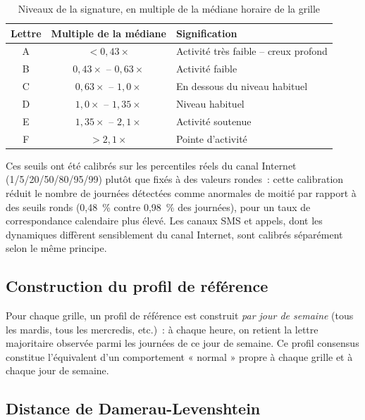\begin{table}[htbp]
  \centering
  \caption{Niveaux de la signature, en multiple de la médiane horaire de la grille}
  \label{tab:levels}
  \begin{tabular}{ccl}
    \toprule
    \textbf{Lettre} & \textbf{Multiple de la médiane} & \textbf{Signification} \\
    \midrule
    A & $< 0{,}43\times$          & Activité très faible -- creux profond \\
    B & $0{,}43\times$ -- $0{,}63\times$ & Activité faible \\
    C & $0{,}63\times$ -- $1{,}0\times$  & En dessous du niveau habituel \\
    D & $1{,}0\times$ -- $1{,}35\times$  & Niveau habituel \\
    E & $1{,}35\times$ -- $2{,}1\times$  & Activité soutenue \\
    F & $> 2{,}1\times$           & Pointe d'activité \\
    \bottomrule
  \end{tabular}
\end{table}

Ces seuils ont été calibrés sur les percentiles réels du canal
Internet (1/5/20/50/80/95/99) plutôt que fixés à des valeurs rondes~:
cette calibration réduit le nombre de journées détectées comme
anormales de moitié par rapport à des seuils ronds (0,48~\% contre
0,98~\% des journées), pour un taux de correspondance calendaire plus
élevé. Les canaux SMS et appels, dont les dynamiques diffèrent
sensiblement du canal Internet, sont calibrés séparément selon le même
principe.

\subsection{Construction du profil de référence}

Pour chaque grille, un profil de référence est construit \emph{par
jour de semaine} (tous les mardis, tous les mercredis, etc.)~: à
chaque heure, on retient la lettre majoritaire observée parmi les
journées de ce jour de semaine. Ce profil consensus constitue
l'équivalent d'un comportement « normal » propre à chaque grille et à
chaque jour de semaine.

\subsection{Distance de Damerau-Levenshtein}
\label{sec:dl}

